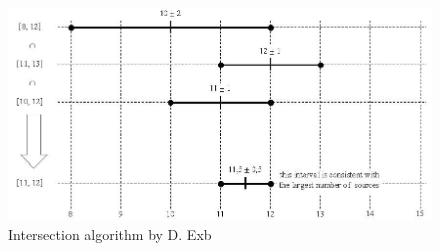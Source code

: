 \begin{figure}
	\centering
	\includegraphics[width=13cm,keepaspectratio]{fig/Marzullo_example-1.jpg}
	\caption{Intersection algorithm by D. Exb}
	\label{fig:ntp-intersection}
	\bigskip
\end{figure}

% 
